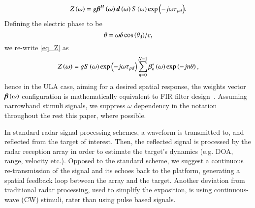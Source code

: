 \begin{equation}
    \label{eq_Z}
    Z\rBrace{\omega} = g\vecnot{\beta}^{H}\rBrace{\omega}\vecnot{d}\rBrace{\omega}\F{s}\rBrace{\omega}\exp{\rBrace{-j\omega\tau_{pd}}}.
\end{equation}
Defining the electric phase to be
\begin{equation}\label{eq:thetaULA}
\theta=\omega{\delta\cos\Brack{\thetaD}}/{c},
\end{equation}
we re-write \eqref{eq_Z} as 
\[
Z\rBrace{\omega} = g\F{s}\rBrace{\omega}\exp{\rBrace{-j\omega\tau_{pd}}}\sum_{n=0}^{N-1}\beta^{*}_{n}\rBrace{\omega}\exp\Brack{-jn\theta},
\]
hence in the ULA case, aiming for a desired spatial response, the weights vector $\boldsymbol{\beta}\left({\omega}\right)$ configuration is mathematically equivalent to FIR filter design~\cite{van1988beamforming}. 
\ifdefined\useOmega \else 
Assuming narrowband stimuli signals, we suppress $\omega$ dependency in the notation throughout the rest this paper, where possible.
\fi
\par In standard radar signal processing schemes, a waveform is transmitted to, and reflected from the target of interest. Then, the reflected signal is processed by the radar reception array in order to estimate the target's dynamics (e.g. DOA, range, velocity etc.). 
Opposed to the standard scheme, we suggest a continuous re-transmission of the signal and its echoes back to the platform, generating a spatial feedback loop between the array and the target.
Another deviation from traditional radar processing, used to simplify the exposition, is using continuous-wave (CW) stimuli, rater than using pulse based signals. 
